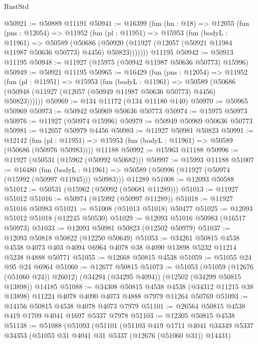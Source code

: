 \begin{lexlean}{RustStd}
\begin{coremodule}
@50921 := @50889 @11191
@50941 := @16399
    (fun (hn : @18) =>
    @12055
      (fun (pns : @12054) =>
      @11952
        (fun (pl : @11951) =>
        @15953
          (fun (bodyL : @11961) =>
          @50589
            (@50686
              (@50920 (@11927 (@12057 (@50921 @11984 @11987 @50636 @50773) @4456) @50823)))))))
    @11195
@50942 := @50913 @11195
@50948 := @11927 (@15975 (@50942 @11987 @50636 @50773) @15996)
@50949 := @50921 @11195
@50965 := @16429
    (fun (pns : @12054) =>
    @11952
      (fun (pl : @11951) =>
      @15953
        (fun (bodyL : @11961) =>
        @50589 (@50686 (@50948 (@11927 (@12057 (@50949 @11987 @50636 @50773) @4456) @50823))))))
@50969 := @134 @11172 (@134 @11180 @140)
@50970 := @50965 @50969
@50973 := @50942 @50969 @50636 @50773
@50974 := @15975 @50973
@50976 := @11927 (@50974 @15996)
@50979 := @50949 @50969 @50636 @50773
@50981 := @12057 @50979 @4456
@50983 := @11927 @50981 @50823
@50991 := @12142
    (fun (pl : @11951) => @15953 (fun (bodyL : @11961) => @50589 (@50686 (@50976 @50983))))
    @11188
@50992 := @15963 @11188
@50996 := @11927 (@50531 (@15962 (@50992 @50682)))
@50997 := @15993 @11188
@51007 := @16480
    (fun (bodyL : @11961) => @50589 (@50996 (@11927 (@50974 (@15992 (@50997 @11945))) @50983)))
    @11289
@51008 := @12093 @50588
@51012 := @50531 (@15962 (@50992 (@50681 @11289)))
@51013 := @11927 @51012
@51016 := @50974 (@15992 (@50997 @11289))
@51018 := @11927 @51016 @50983
@51021 := @51008 (@51013 @51018) @50477
@51025 := @12093 @51012 @51018 (@12245 @50530)
@51029 := @12093 @51016 @50983 (@16517 @50973)
@51033 := @12093 @50981 @50823 (@12502 @50979)
@51037 := @12093 @50818 @50822 (@12250 @50649)
@51053 := @34261
    @50815
    @4538
    @4538
    @4073
    @403
    @4094
    @6964
    @4078
    @38
    @4090
    @13898
    @5232
    @11214
    @5238
    @4888
    @50771
@51055 := @12668 @50815 @4538
@51059 := @51055 @24 @95 @24 @6964
@51060 := @12677 @50815
@51073 := @51053
    (@51059 (@12676 (@51060 @24)) @26012)
    (@34294 (@34295 @4094))
    (@12502 (@34299 @50815 @13898))
    @14185
@51088 := @34308
    @50815
    @4538
    @4538
    (@34312 @11215 @38 @13898)
    @11224
    @4078
    @4090
    @4073
    @4888
    @7979
    @11264
    @50769
@51093 := @14156 @50815 @4538 @4078 @4073 @7979
@51101 := @26564 @50815 @4538 @419 @1709 @4041 @1697 @5337 @7978
@51103 := @12305 @50815 @4538
@51138 := @51088
    (@51093
      (@51101
        (@51103
          @419
          @1711
          @4041
          @34349
          @5337
          @34353
          (@51055 @31 @4041 @31 @5337 (@12676 (@51060 @31)) @14431)

\end{coremodule}
\end{lexlean}

